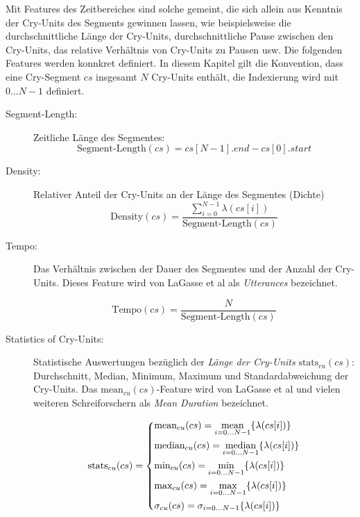 Mit Features des Zeitbereiches sind solche gemeint, die sich allein aus Kenntnis der Cry-Units des Segments gewinnen lassen, wie beispielsweise die durchschnittliche Länge der Cry-Units, durchschnittliche Pause zwischen den Cry-Units, das relative Verhältnis von Cry-Units zu Pausen usw. Die folgenden Features werden konnkret definiert. In diesem Kapitel gilt die Konvention, dass eine Cry-Segment $cs$ insgesamt $N$ Cry-Units enthält, die Indexierung wird mit $0 \ldots N-1$ definiert.

\begin{description}
\item[Segment-Length: ] Zeitliche Länge des Segmentes:
\begin{equation}
\text{Segment-Length}(cs) = cs[N-1].end - cs[0].start
\label{eq:segment_length}
\end{equation}

\item[Density: ] Relativer Anteil der Cry-Units an der Länge des Segmentes (\glqq Dichte\grqq{})
\begin{equation}
\text{Density}(cs) = \frac{\sum_{i = 0}^{N-1} \lambda(cs[i])}{\text{Segment-Length}(cs)}
\end{equation}

\item[Tempo:] Das Verhältnis zwischen der Dauer des Segmentes und der Anzahl der Cry-Units. Dieses Feature wird von LaGasse et al \cite[S. 85]{parentalPerception} als \emph{Utterances} bezeichnet.

\begin{equation}
\text{Tempo}(cs) =  \frac{N}{\text{Segment-Length}(cs)}
\end{equation}

\item[Statistics of Cry-Units:] Statistische Auswertungen bezüglich der \emph{Länge der Cry-Units} $\text{stats}_{cu}(cs)$: Durchschnitt, Median, Minimum, Maximum und Standardabweichung der Cry-Units. Das $\text{mean}_{cu}(cs)$-Feature wird von LaGasse et al \cite[S. 85]{parentalPerception} und vielen weiteren Schreiforschern als \emph{Mean Duration} bezeichnet.

\begin{equation}
\text{stats}_{cu}(cs) = 
\begin{dcases}
\text{mean}_{cu}(cs) = \operatorname*{mean}_{i = 0 \ldots N-1}\{\lambda(cs[i])\} \\
\text{median}_{cu}(cs) = \operatorname*{median}_{i = 0 \ldots N-1}\{\lambda(cs[i])\} \\
\text{min}_{cu}(cs) = \operatorname*{min}_{i = 0 \ldots N-1}\{\lambda(cs[i])\} \\
\text{max}_{cu}(cs) = \operatorname*{max}_{i = 0 \ldots N-1}\{\lambda(cs[i])\} \\
\sigma_{cu}(cs) =  \sigma_{i = 0 \ldots N-1}\{\lambda(cs[i])\} 
\end{dcases}
\label{eq:featuresOfCryUnits}
\end{equation}


\end{description}
